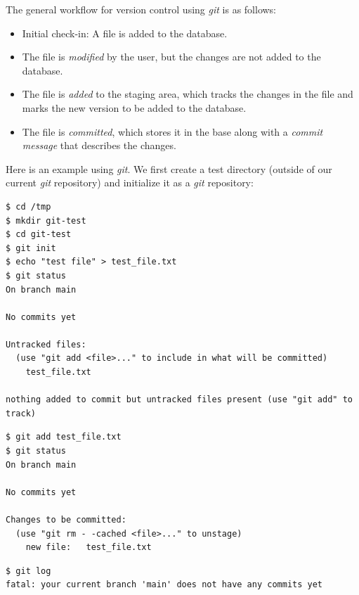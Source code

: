 The general workflow for version control using \textit{git} is as follows:

\begin{itemize}
\item Initial check-in: A file is added to the database.
\item The file is \textit{modified} by the user, but the changes are not added to the database.
\item The file is \textit{added} to the staging area, which tracks the changes in the file and marks the new version to be added to the database.
\item The file is \textit{committed}, which stores it in the base along with a \textit{commit message} that describes the changes.
\end{itemize}

Here is an example using \textit{git}.
We first create a test directory (outside of our current \textit{git} repository) and initialize it as a \textit{git} repository:

\begin{lstlisting}[style=shell]
$ cd /tmp
$ mkdir git-test
$ cd git-test
$ git init
$ echo "test file" > test_file.txt
$ git status
On branch main

No commits yet

Untracked files:
  (use "git add <file>..." to include in what will be committed)
	test_file.txt

nothing added to commit but untracked files present (use "git add" to track)
\end{lstlisting}


\begin{lstlisting}[style=shell]
$ git add test_file.txt
$ git status
On branch main

No commits yet

Changes to be committed:
  (use "git rm - -cached <file>..." to unstage)
	new file:   test_file.txt
\end{lstlisting}


\begin{lstlisting}[style=shellshort]
$ git log
fatal: your current branch 'main' does not have any commits yet
\end{lstlisting}

